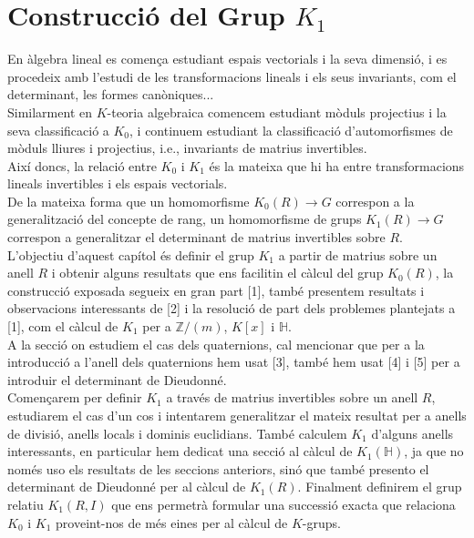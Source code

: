 

\chapter{Construcció del Grup $K_1$} %

\label{Chapter3} %

En àlgebra lineal es comença estudiant espais vectorials i la seva dimensió, i es procedeix amb l'estudi de les transformacions lineals i els seus invariants, com el determinant, les formes canòniques... \\
Similarment en $K$-teoria algebraica comencem estudiant  mòduls projectius i la seva classificació a $K_0$, i continuem estudiant la classificació d'automorfismes de mòduls lliures i projectius, i.e., invariants de matrius invertibles. \\
Així doncs, la relació entre $K_0$ i $K_1$ és la mateixa que hi ha entre transformacions lineals invertibles i els espais vectorials. \\
\indent De la mateixa forma que un homomorfisme $K_0(R)\rightarrow G$ correspon a la generalització del concepte de rang, un homomorfisme de grups $K_1(R)\rightarrow G$ correspon a generalitzar el determinant de matrius invertibles sobre $R$. \\
\indent L'objectiu d'aquest capítol és definir el grup $K_1$ a partir de matrius sobre un anell $R$ i obtenir alguns resultats que ens facilitin el càlcul del grup $K_0(R)$, la construcció exposada segueix en gran part [1], també presentem resultats i observacions interessants de [2] i la resolució de part dels problemes plantejats a [1], com el càlcul de $K_1$ per a $\mathbb{Z}/(m)$, $K[x]$ i $\mathbb{H}$.\\
A la secció on estudiem el cas dels quaternions, cal mencionar que per a la introducció a l'anell dels quaternions hem usat [3], també hem usat [4] i [5] per a introduir el determinant de Dieudonné. \\
\indent Començarem per definir $K_1$ a través de matrius invertibles sobre un anell $R$, estudiarem el cas d'un cos i intentarem generalitzar el mateix resultat per a anells de divisió, anells locals i dominis euclidians. També calculem $K_1$ d'alguns anells interessants, en particular hem dedicat una secció al càlcul de $K_1(\mathbb{H})$, ja que no només uso els resultats de les seccions anteriors, sinó que també presento el determinant de Dieudonné per al càlcul de $K_1(R)$. Finalment definirem el grup relatiu $K_1(R,I)$ que ens permetrà formular una successió exacta que relaciona $K_0$ i $K_1$ proveint-nos de més eines per al càlcul de $K$-grups.

